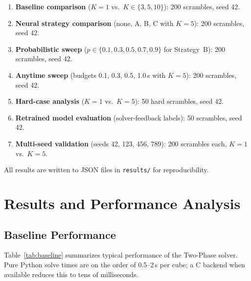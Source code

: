 \documentclass[10pt,twocolumn,a4paper]{article}
\begin{document}
\begin{enumerate}[leftmargin=*]
  \item \textbf{Baseline comparison} ($K{=}1$ vs.\ $K \in \{3, 5, 10\}$): 200 scrambles, seed 42.
  \item \textbf{Neural strategy comparison} (none, A, B, C with $K{=}5$): 200 scrambles, seed 42.
  \item \textbf{Probabilistic sweep} ($p \in \{0.1, 0.3, 0.5, 0.7, 0.9\}$ for Strategy~B): 200 scrambles, seed 42.
  \item \textbf{Anytime sweep} (budgets 0.1, 0.3, 0.5, 1.0\,s with $K{=}5$): 200 scrambles, seed 42.
  \item \textbf{Hard-case analysis} ($K{=}1$ vs.\ $K{=}5$): 50 hard scrambles, seed 42.
  \item \textbf{Retrained model evaluation} (solver-feedback labels): 50 scrambles, seed 42.
  \item \textbf{Multi-seed validation} (seeds 42, 123, 456, 789): 200 scrambles each, $K{=}1$ vs.\ $K{=}5$.
\end{enumerate}

All results are written to JSON files in \texttt{results/} for reproducibility.

\section{Results and Performance Analysis}
\label{sec:results}

\subsection{Baseline Performance}
Table~\ref{tab:baseline} summarizes typical performance of the Two-Phase solver. Pure Python solve times are on the order of 0.5--2\,s per cube; a C backend when available reduces this to tens of milliseconds.
\end{document}

